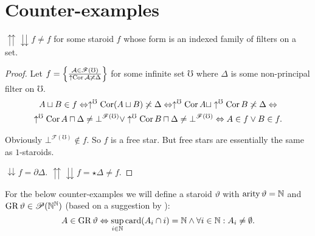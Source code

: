 \section{Counter-examples}
\begin{example}
$\upuparrows\downdownarrows f\neq f$ for some staroid $f$ whose
form is an indexed family of filters on a set.\end{example}
\begin{proof}
Let $f=\left\{ \frac{\mathcal{A}\in\mathscr{F}(\mho)}{\uparrow\operatorname{Cor}\mathcal{A}\not\asymp\Delta}\right\}$
for some infinite set $\mho$ where $\Delta$ is some non-principal
filter on $\mho$.
\begin{multline*}
A\sqcup B\in f\Leftrightarrow\uparrow^{\mho}\operatorname{Cor}(A\sqcup B)\not\asymp\Delta\Leftrightarrow\uparrow^{\mho}\operatorname{Cor} A\sqcup\uparrow^{\mho}\operatorname{Cor} B\not\asymp\Delta\Leftrightarrow\\
\uparrow^{\mho}\operatorname{Cor} A\sqcap\Delta\neq\bot^{\mathscr{F}(\mho)}\vee\uparrow^{\mho}\operatorname{Cor} B\sqcap\Delta\neq\bot^{\mathscr{F}(\mho)}\Leftrightarrow A\in f\vee B\in f.
\end{multline*}


Obviously $\bot^{\mathscr{F}(\mho)}\notin f$. So $f$ is a free star.
But free stars are essentially the same as $1$-staroids.

$\downdownarrows f=\partial\Delta$. $\upuparrows\downdownarrows f=\star\Delta\neq f$.
\end{proof}
For the below counter-examples we will define a staroid $\vartheta$
with $\operatorname{arity}\vartheta=\mathbb{N}$ and $\operatorname{GR}\vartheta\in\mathscr{P}(\mathbb{N}^{\mathbb{N}})$
(based on a suggestion by ): 
\[
A\in\operatorname{GR}\vartheta\Leftrightarrow\sup_{i\in\mathbb{N}}\operatorname{card}(A_{i}\cap i)=\mathbb{N}\wedge\forall i\in\mathbb{N}:A_{i}\neq\emptyset.
\]

